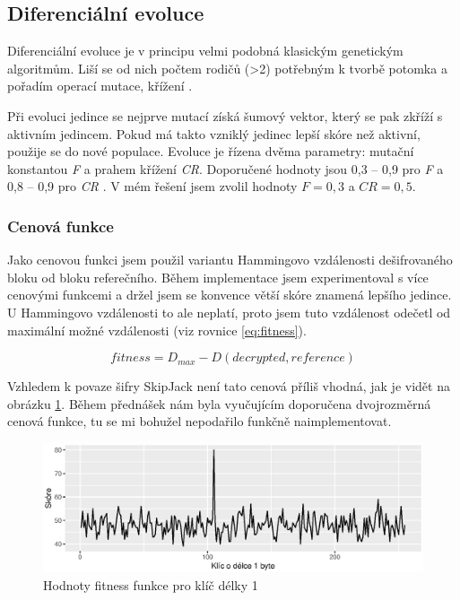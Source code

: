 \documentclass[11pt,a4paper]{scrartcl}
\begin{document}
	\subsection{Diferenciální evoluce}
	Diferenciální evoluce je v principu velmi podobná klasickým genetickým algoritmům. Liší se od nich počtem rodičů (\textgreater2) potřebným k tvorbě potomka a pořadím operací mutace, křížení \cite{hlavacek_de}. 
	
	Při evoluci jedince se nejprve mutací získá šumový vektor, který se pak zkříží s aktivním jedincem. Pokud má takto vzniklý jedinec lepší skóre než aktivní, použije se do nové populace.
	Evoluce je řízena dvěma parametry: mutační konstantou \textit{F} a prahem křížení \textit{CR}. Doporučené hodnoty jsou 0,3 -- 0,9 pro \textit{F} a 0,8 -- 0,9 pro \textit{CR} \cite{hlavacek_de}. V mém řešení jsem zvolil hodnoty $F=0,3$ a $CR=0,5$.
	
	\subsubsection{Cenová funkce}
	Jako cenovou funkci jsem použil variantu Hammingovo vzdálenosti dešifrovaného bloku od bloku referečního. Během implementace jsem experimentoval s více cenovými funkcemi a držel jsem se konvence větší skóre znamená lepšího jedince. U Hammingovo vzdálenosti to ale neplatí, proto jsem tuto vzdálenost odečetl od maximální možné vzdálenosti (viz rovnice \ref{eq:fitness}).
	
	\begin{equation}
		fitness = D_{max} - D(decrypted,reference)
		\label{eq:fitness}
	\end{equation}
	
	Vzhledem k povaze šifry SkipJack není tato cenová příliš vhodná, jak je vidět na obrázku \ref{fig:fitness-chart}. Během přednášek nám byla vyučujícím doporučena dvojrozměrná cenová funkce, tu se mi bohužel nepodařilo funkčně naimplementovat.
	
	\begin{figure}[!h]
		\centering
		\includegraphics[width=15cm]{img/fitness-plot}
		\caption{Hodnoty fitness funkce pro klíč délky 1}
		\label{fig:fitness-chart}
	\end{figure}
\end{document}
